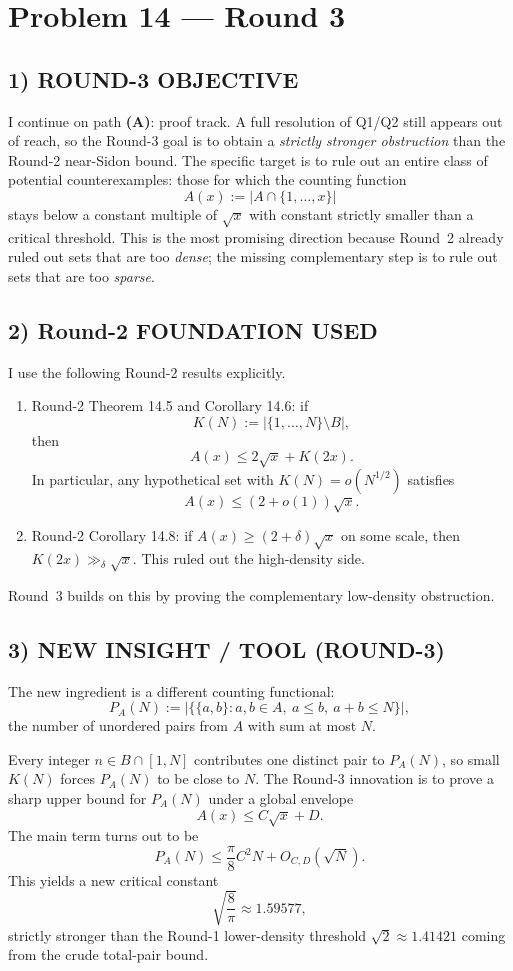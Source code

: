 \section{Problem 14 --- Round 3}

\subsection*{1) ROUND-3 OBJECTIVE}
I continue on path \textbf{(A)}: proof track. A full resolution of Q1/Q2 still appears out of reach, so the Round-3 goal is to obtain a \emph{strictly stronger obstruction} than the Round-2 near-Sidon bound. The specific target is to rule out an entire class of potential counterexamples: those for which the counting function
\[
A(x):=|A\cap\{1,\dots,x\}|
\]
stays below a constant multiple of $\sqrt{x}$ with constant strictly smaller than a critical threshold. This is the most promising direction because Round~2 already ruled out sets that are too \emph{dense}; the missing complementary step is to rule out sets that are too \emph{sparse}.

\subsection*{2) Round-2 FOUNDATION USED}
I use the following Round-2 results explicitly.
\begin{enumerate}
\item Round-2 Theorem 14.5 and Corollary 14.6: if
\[
K(N):=|\{1,\dots,N\}\setminus B|,
\]
then
\[
A(x)\le 2\sqrt{x}+K(2x).
\]
In particular, any hypothetical set with $K(N)=o(N^{1/2})$ satisfies
\[
A(x)\le (2+o(1))\sqrt{x}.
\]
\item Round-2 Corollary 14.8: if $A(x)\ge (2+\delta)\sqrt{x}$ on some scale, then $K(2x)\gg_\delta \sqrt{x}$. This ruled out the high-density side.
\end{enumerate}
Round~3 builds on this by proving the complementary low-density obstruction.

\subsection*{3) NEW INSIGHT / TOOL (ROUND-3)}
The new ingredient is a different counting functional:
\[
P_A(N):=\bigl|\{\{a,b\}:a,b\in A,\ a\le b,\ a+b\le N\}\bigr|,
\]
the number of unordered pairs from $A$ with sum at most $N$.

Every integer $n\in B\cap[1,N]$ contributes one distinct pair to $P_A(N)$, so small $K(N)$ forces $P_A(N)$ to be close to $N$. The Round-3 innovation is to prove a sharp upper bound for $P_A(N)$ under a global envelope
\[
A(x)\le C\sqrt{x}+D.
\]
The main term turns out to be
\[
P_A(N)\le \frac{\pi}{8}C^2N+O_{C,D}(\sqrt N).
\]
This yields a new critical constant
\[
\sqrt{\frac{8}{\pi}}\approx 1.59577,
\]
strictly stronger than the Round-1 lower-density threshold $\sqrt2\approx 1.41421$ coming from the crude total-pair bound.

